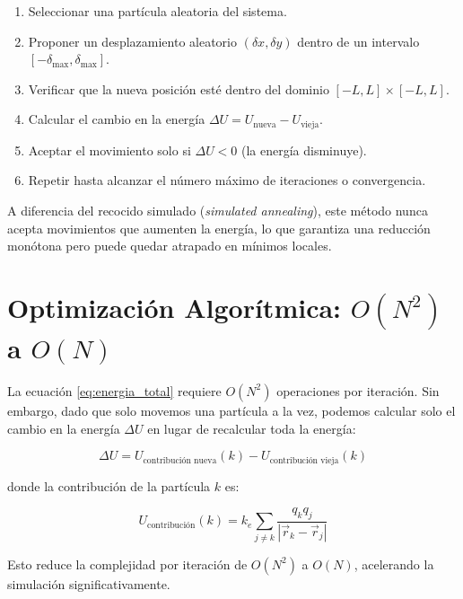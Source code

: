 \begin{enumerate}
    \item Seleccionar una partícula aleatoria del sistema.
    \item Proponer un desplazamiento aleatorio \((\delta x, \delta y)\) dentro de un intervalo \([-\delta_{\text{max}}, \delta_{\text{max}}]\).
    \item Verificar que la nueva posición esté dentro del dominio \([-L, L] \times [-L, L]\).
    \item Calcular el cambio en la energía \(\Delta U = U_{\text{nueva}} - U_{\text{vieja}}\).
    \item Aceptar el movimiento solo si \(\Delta U < 0\) (la energía disminuye).
    \item Repetir hasta alcanzar el número máximo de iteraciones o convergencia.
\end{enumerate}

A diferencia del recocido simulado (\textit{simulated annealing}), este método nunca acepta movimientos que aumenten la energía, lo que garantiza una reducción monótona pero puede quedar atrapado en mínimos locales.

\section{Optimización Algorítmica: \(O(N^2)\) a \(O(N)\)}
La ecuación \eqref{eq:energia_total} requiere \(O(N^2)\) operaciones por iteración. Sin embargo, dado que solo movemos una partícula a la vez, podemos calcular solo el cambio en la energía \(\Delta U\) en lugar de recalcular toda la energía:

\begin{equation}
    \Delta U = U_{\text{contribución nueva}}(k) - U_{\text{contribución vieja}}(k)
\end{equation}

donde la contribución de la partícula \(k\) es:

\begin{equation}
    U_{\text{contribución}}(k) = k_e \sum_{j \neq k} \frac{q_k q_j}{|\vec{r}_k - \vec{r}_j|}
\end{equation}

Esto reduce la complejidad por iteración de \(O(N^2)\) a \(O(N)\), acelerando la simulación significativamente.
